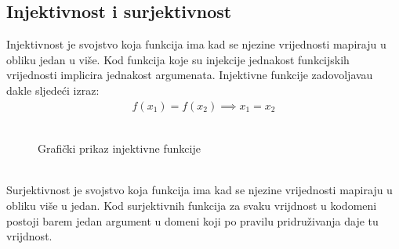 \subsection{Injektivnost i surjektivnost \label{injekt}}
    Injektivnost je svojstvo koja funkcija ima kad se njezine vrijednosti mapiraju u obliku jedan u više.
    Kod funkcija koje su injekcije jednakost funkcijskih vrijednosti implicira jednakost argumenata.
    Injektivne funkcije zadovoljavau dakle sljedeći izraz:
    \begin{equation*}
        \begin{split}
            f(x_1) = f(x_2) \implies x_1 = x_2
        \end{split}
    \end{equation*}
    \\
    \begin{figure}[ht]
        \centering
        \caption{Grafički prikaz injektivne funkcije} 
        \label{fig:template}
    \end{figure}
    \\
    Surjektivnost je svojstvo koja funkcija ima kad se njezine vrijednosti mapiraju u obliku više u jedan.
    Kod surjektivnih funkcija za svaku vrijdnost u kodomeni postoji barem jedan argument u domeni koji po pravilu pridruživanja daje tu vrijdnost.
